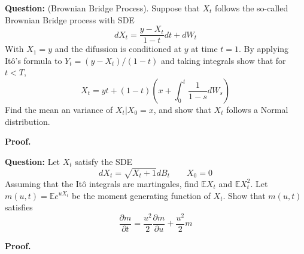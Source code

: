 \documentclass{article}
\begin{document}
\begin{tcolorbox}[colframe=black,colback=gray!5,boxrule=0.5pt]
\textbf{Question:} (Brownian Bridge Process). Suppose that $X_t$ follows the so-called Brownian Bridge process with SDE
$$dX_t = \frac{y-X_t}{1-t}dt + dW_t$$
With $X_1=y$ and the difussion is conditioned at $y$ at time $t=1$.
By applying Itô's formula to $Y_t = (y-X_t)/(1-t)$ and taking integrals show that for $t<T$,
$$X_t = yt + (1-t)\left(x+\int_0^t\frac{1}{1-s}dW_s\right)$$
Find the mean an variance of $X_t| X_0=x$, and show that $X_t$ follows a Normal distribution.
\end{tcolorbox}
\textbf{Proof.}


\begin{tcolorbox}[colframe=black,colback=gray!5,boxrule=0.5pt]
\textbf{Question:} Let $X_t$ satisfy the SDE 
$$dX_t = \sqrt{X_t+1}dB_t \quad\quad X_0=0$$
Assuming that the Itô integrals are martingales, find $\mathbb{E}X_t$ and $\mathbb{E}X_t^2$. Let $m(u,t)=\mathbb{E}e^{uX_t}$ be the moment generating function of $X_t$. Show that $m(u,t)$ satisfies
$$\frac{\partial m}{\partial t} = \frac{u^2}{2}\frac{\partial m}{\partial u} + \frac{u^2}{2}m$$
\end{tcolorbox}
\textbf{Proof.}
\end{document}
